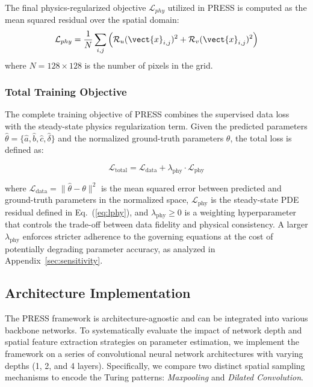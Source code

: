 \documentclass{article} %
\begin{document}
The final physics-regularized objective $\mathcal{L}_{phy}$ utilized in PRESS is computed as the mean squared residual over the spatial domain:
\begin{equation}
    \mathcal{L}_{phy} = \frac{1}{N} \sum_{i,j} \left( \mathcal{R}_u(\vect{x}_{i,j})^2 + \mathcal{R}_v(\vect{x}_{i,j})^2 \right)
    \label{eq:lphy}
\end{equation}
where $N = 128 \times 128$ is the number of pixels in the grid.

\subsubsection{Total Training Objective}

The complete training objective of PRESS combines the supervised data loss with the steady-state physics regularization term. Given the predicted parameters $\hat{\theta} = \{\hat{a}, \hat{b}, \hat{c}, \hat{\delta}\}$ and the normalized ground-truth parameters $\theta$, the total loss is defined as:

\begin{equation}
    \mathcal{L}_{\text{total}} = \mathcal{L}_{\text{data}} + \lambda_{\text{phy}} \cdot \mathcal{L}_{\text{phy}}
\end{equation}

where $\mathcal{L}_{\text{data}} = \|\hat{\theta} - \theta\|^2$ is the mean squared error between predicted and ground-truth parameters in the normalized space, $\mathcal{L}_{\text{phy}}$ is the steady-state PDE residual defined in Eq.~(\ref{eq:lphy}), and $\lambda_{\text{phy}} \geq 0$ is a weighting hyperparameter that controls the trade-off between data fidelity and physical consistency. A larger $\lambda_{\text{phy}}$ enforces stricter adherence to the governing equations at the cost of potentially degrading parameter accuracy, as analyzed in Appendix~\ref{sec:sensitivity}.

\subsection{Architecture Implementation}

The PRESS framework is architecture-agnostic and can be integrated into various backbone networks. To systematically evaluate the impact of network depth and spatial feature extraction strategies on parameter estimation, we implement the framework on a series of convolutional neural network architectures with varying depths (1, 2, and 4 layers). Specifically, we compare two distinct spatial sampling mechanisms to encode the Turing patterns: \textit{Maxpooling} and \textit{Dilated Convolution}.
\end{document}
